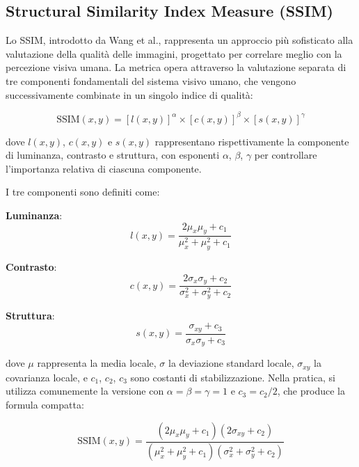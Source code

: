 \subsection{Structural Similarity Index Measure (SSIM)}

Lo SSIM, introdotto da Wang et al., rappresenta un approccio più sofisticato alla valutazione della qualità delle immagini, progettato per correlare meglio con la percezione visiva umana. La metrica opera attraverso la valutazione separata di tre componenti fondamentali del sistema visivo umano, che vengono successivamente combinate in un singolo indice di qualità:

\begin{equation}
	\text{SSIM}(x,y) = [l(x,y)]^{\alpha} \times [c(x,y)]^{\beta} \times [s(x,y)]^{\gamma}
\end{equation}

dove $l(x,y)$, $c(x,y)$ e $s(x,y)$ rappresentano rispettivamente la componente di luminanza, contrasto e struttura, con esponenti $\alpha$, $\beta$, $\gamma$ per controllare l'importanza relativa di ciascuna componente.

I tre componenti sono definiti come:\newline

\textbf{Luminanza}:
\begin{equation}
	l(x,y) = \frac{2\mu_x\mu_y + c_1}{\mu_x^2 + \mu_y^2 + c_1}
\end{equation}

\textbf{Contrasto}:
\begin{equation}
	c(x,y) = \frac{2\sigma_x\sigma_y + c_2}{\sigma_x^2 + \sigma_y^2 + c_2}
\end{equation}

\textbf{Struttura}:
\begin{equation}
	s(x,y) = \frac{\sigma_{xy} + c_3}{\sigma_x\sigma_y + c_3}
\end{equation}

dove $\mu$ rappresenta la media locale, $\sigma$ la deviazione standard locale, $\sigma_{xy}$ la covarianza locale, e $c_1$, $c_2$, $c_3$ sono costanti di stabilizzazione.\newline
Nella pratica, si utilizza comunemente la versione con $\alpha = \beta = \gamma = 1$ e $c_3 = c_2/2$, che produce la formula compatta:

\begin{equation}
	\text{SSIM}(x,y) = \frac{(2\mu_x\mu_y + c_1)(2\sigma_{xy} + c_2)}{(\mu_x^2 + \mu_y^2 + c_1)(\sigma_x^2 + \sigma_y^2 + c_2)}
\end{equation}

